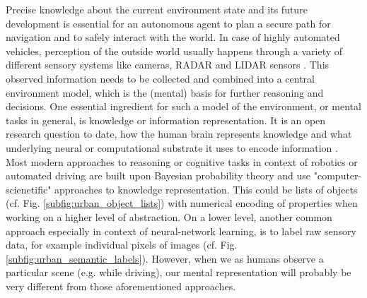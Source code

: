 Precise knowledge about the current environment state and its future development is essential for an autonomous agent to plan a secure path for navigation and to safely interact with the world.
In case of highly automated vehicles, perception of the outside world usually happens through a variety of different sensory systems like cameras, \acs{RADAR} and \acs{LIDAR} sensors \cite{Aeberhard2015}.
This observed information needs to be collected and combined into a central environment model, which is the (mental) basis for further reasoning and decisions.
One essential ingredient for such a model of the environment, or mental tasks in general, is knowledge or information representation.
It is an open research question to date, how the human brain represents knowledge and what underlying neural or computational substrate it uses to encode information \cite{Wang2003, Samsonovich2012, Handjaras2016}.
Most modern approaches to reasoning or cognitive tasks in context of robotics or automated driving are built upon Bayesian probability theory and use "computer-scienetific" approaches to knowledge representation.
This could be lists of objects (cf. Fig. \ref{subfig:urban_object_lists}) with numerical encoding of properties when working on a higher level of abstraction.
On a lower level, another common approach especially in context of neural-network learning, is to label raw sensory data, for example individual pixels of images (cf. Fig. \ref{subfig:urban_semantic_labels}).
However, when we as humans observe a particular scene (e.g. while driving), our mental representation will probably be very different from those aforementioned approaches.
